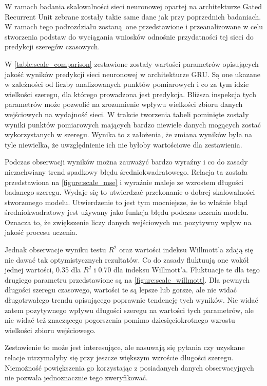 \documentclass[10pt,a4paper]{article}
\begin{document}
W ramach badania skalowalności sieci neuronowej opartej na architekturze Gated Recurrent Unit zebrane zostały takie same dane jak przy poprzednich badaniach. W ramach tego podrozdziału zostaną one przedstawione i przeanalizowane w celu stworzenia podstaw do wyciągania wniosków odnośnie przydatności tej sieci do predykcji szeregów czasowych. 

W \autoref{table:scale_comparison} zestawione zostały wartości parametrów opisujących jakość wyników predykcji sieci neuronowej w architekturze GRU. Są one ukazane w zależności od liczby analizowanych punktów pomiarowych i co za tym idzie wielkości szeregu, dla którego prowadzona jest predykcja. Bliższa inspekcja tych parametrów może pozwolić na zrozumienie wpływu wielkości zbioru danych wejściowych na wydajność sieci. W trakcie tworzenia tabeli pominięte zostały wyniki punktów pomiarowych mających bardzo niewiele danych mogących zostać wykorzystanych w szeregu. Wynika to z założenia, że zmiana wyników była na tyle niewielka, że uwzględnienie ich nie byłoby wartościowe dla zestawienia. 

Podczas obserwacji wyników można zauważyć bardzo wyraźny i co do zasady niezachwiany trend spadkowy błędu średniokwadratowego. Relacja ta została przedstawiona na \autoref{figure:scale_mse} i wyraźnie maleje ze wzrostem długości badanego szeregu. Wydaje się to utwierdzać przekonanie o dobrej skalowalności stworzonego modelu. Utwierdzenie to jest tym mocniejsze, że to właśnie błąd średniokwadratowy jest używany jako funkcja błędu podczas uczenia modelu. Oznacza to, że zwiększenie liczy danych wejściowych ma pozytywny wpływ na jakość procesu uczenia. 

Jednak obserwacje wyniku testu $R^2$ oraz wartości indeksu Willmott'a zdają się nie dawać tak optymistycznych rezultatów. Co do zasady fluktuują one wokół jednej wartości, 0.35 dla $R^2$ i 0.70 dla indeksu Willmott'a. Fluktuacje te dla tego drugiego parametru przedstawione są na \autoref{figure:scale_willmott}. Dla pewnych długości szeregu czasowego, wartości te są lepsze lub gorsze, ale nie widać długotrwałego trendu opisującego poprawnie tendencję tych wyników. Nie widać zatem pozytywnego wpływu długości szeregu na wartości tych parametrów, ale nie widać też znaczącego pogorszenia pomimo dziesięciokrotnego wzrostu wielkości zbioru wejściowego. 

Zestawienie to może jest interesujące, ale nasuwają się pytania czy uzyskane relacje utrzymałyby się przy jeszcze większym wzroście długości szeregu. Niemożność powiększenia go korzystając z posiadanych danych obserwacyjnych nie pozwala jednoznacznie tego zweryfikować. 
\end{document}

